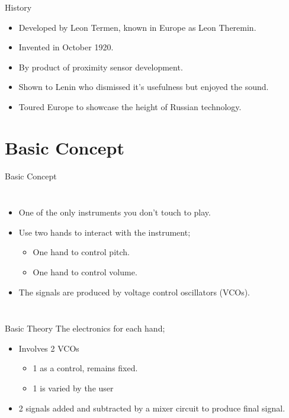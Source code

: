 \documentclass{beamer}
\begin{document}
\begin{frame}{History}
	\begin{itemize}
		\item Developed by Leon Termen, known in Europe as Leon Theremin.
		\item Invented in October 1920.
		\item By product of proximity sensor development.
		\item Shown to Lenin who dismissed it's usefulness but enjoyed the sound.
		\item Toured Europe to showcase the height of Russian technology.
	\end{itemize}
\end{frame}

\section{Basic Concept}

\begin{frame}{Basic Concept}
	\begin{columns}[c]
		\begin{itemize}
			\item One of the only instruments you don't touch to play.
			\item Use two hands to interact with the instrument;
			\begin{itemize}
				\item One hand to control pitch.
				\item One hand to control volume.
			\end{itemize}
			\item The signals are produced by voltage control oscillators (VCOs).
		\end{itemize}
		\vspace{2cm}
		\hspace{-5cm}
		\begin{centering}
			\par
		\end{centering}
	\end{columns}
\end{frame}

\begin{frame}{Basic Theory}
The electronics for each hand;
\begin{itemize}
	\item Involves 2 VCOs
		\begin{itemize}
			\item 1 as a control, remains fixed.	
			\item 1 is varied by the user
		\end{itemize}
	\item 2 signals added and subtracted by a mixer circuit to produce final signal.
\end{itemize}
\end{frame}
\end{document}

